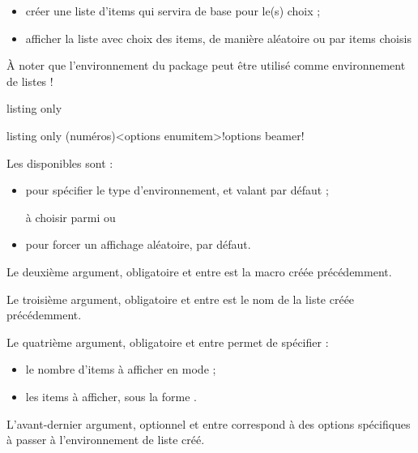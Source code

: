 \documentclass[french,11pt,a4paper]{article}
\begin{document}
\begin{itemize}
	\item créer une liste d'items qui servira de base pour le(s) choix ;
	\item afficher la liste avec choix des items, de manière aléatoire ou par items choisis
\end{itemize}

À noter que l'environnement  du package peut être utilisé comme environnement de listes !

\begin{DemoCode}{listing only}
\end{DemoCode}

\begin{DemoCode}{listing only}
(numéros)<options enumitem>!options beamer!
\end{DemoCode}

Les  disponibles sont :

\begin{itemize}
	\item {} pour spécifier le type d'environnement, et valant  par défaut ;
	
	\hfill{}à choisir parmi   ou 
	\item {} pour forcer un affichage aléatoire,  par défaut.
\end{itemize}

Le deuxième argument, obligatoire et entre  est la macro créée précédemment.

Le troisième argument, obligatoire et entre  est le nom de la liste créée précédemment.

Le quatrième argument, obligatoire et entre  permet de spécifier :

\begin{itemize}
	\item le nombre d'items à afficher en mode  ;
	\item les items à afficher, sous la forme .
\end{itemize}

L'avant-dernier argument, optionnel et entre  correspond à des options spécifiques à passer à l'environnement de liste  créé.
\end{document}
